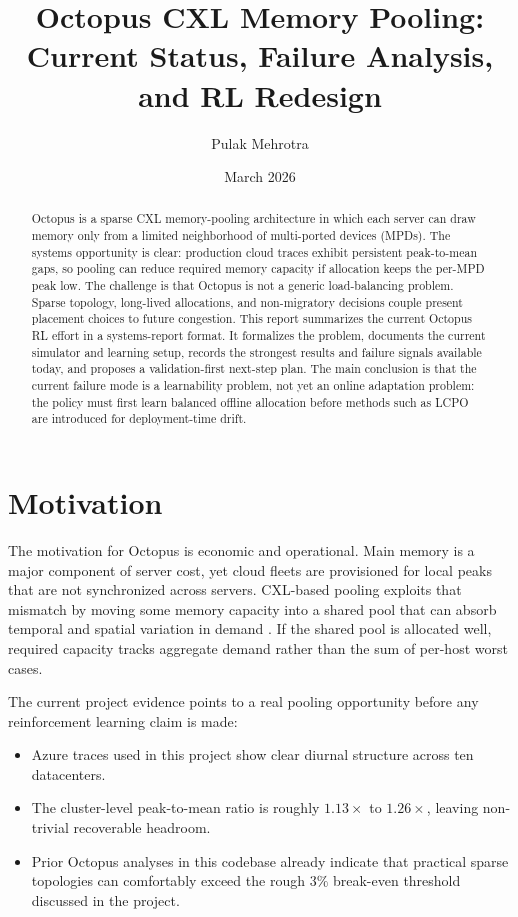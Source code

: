 \documentclass[11pt]{article}
\title{Octopus CXL Memory Pooling:\\Current Status, Failure Analysis, and RL Redesign}
\author{Pulak Mehrotra}
\date{March 2026}
\theoremstyle{definition}
\begin{document}
\maketitle

\begin{abstract}
Octopus is a sparse CXL memory-pooling architecture in which each server can draw
memory only from a limited neighborhood of multi-ported devices (MPDs). The
systems opportunity is clear: production cloud traces exhibit persistent
peak-to-mean gaps, so pooling can reduce required memory capacity if allocation
keeps the per-MPD peak low. The challenge is that Octopus is not a generic
load-balancing problem. Sparse topology, long-lived allocations, and
non-migratory decisions couple present placement choices to future congestion.
This report summarizes the current Octopus RL effort in a systems-report format.
It formalizes the problem, documents the current simulator and learning setup,
records the strongest results and failure signals available today, and proposes a
validation-first next-step plan. The main conclusion is that the current failure
mode is a learnability problem, not yet an online adaptation problem: the policy
must first learn balanced offline allocation before methods such as LCPO are
introduced for deployment-time drift.
\end{abstract}

\tableofcontents
\newpage

\section{Motivation}

The motivation for Octopus is economic and operational. Main memory is a major
component of server cost, yet cloud fleets are provisioned for local peaks that
are not synchronized across servers. CXL-based pooling exploits that mismatch by
moving some memory capacity into a shared pool that can absorb temporal and
spatial variation in demand \cite{pond2023}. If the shared pool is allocated
well, required capacity tracks aggregate demand rather than the sum of per-host
worst cases.

The current project evidence points to a real pooling opportunity before any
reinforcement learning claim is made:
\begin{itemize}[nosep]
    \item Azure traces used in this project show clear diurnal structure across
    ten datacenters.
    \item The cluster-level peak-to-mean ratio is roughly $1.13\times$ to
    $1.26\times$, leaving non-trivial recoverable headroom.
    \item Prior Octopus analyses in this codebase already indicate that practical
    sparse topologies can comfortably exceed the rough $3\%$ break-even threshold
    discussed in the project.
\end{itemize}
\end{document}
